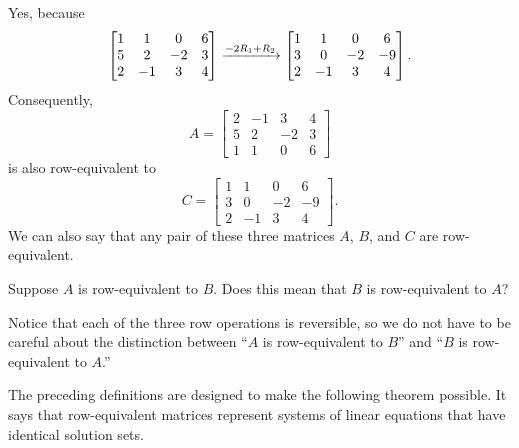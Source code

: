 \documentclass{ximera}
\begin{document}
\begin{example}
\begin{question}
    \begin{feedback}
      Yes, because
      \[
        \begin{bmatrix}
          1&1&0&6\\
          5&2&-2&3\\
          2&-1&3&4
        \end{bmatrix}
        \xrightarrow{-2R_{1}+R_{2}}
        \begin{bmatrix}
          1&1&0&6\\
          3&0&-2&-9\\
          2&-1&3&4
        \end{bmatrix}.
      \]
      Consequently, 
      \[
        A=\begin{bmatrix}
          2&-1&3&4\\
          5&2&-2&3\\
          1&1&0&6
        \end{bmatrix}
      \]
      is also row-equivalent to
      \[
        C = \begin{bmatrix}
          1&1&0&6\\
          3&0&-2&-9\\
          2&-1&3&4
        \end{bmatrix}.
      \]
      We can also say that any pair of these three matrices $A$, $B$, and $C$ are row-equivalent.
    \end{feedback}
  \end{question}
\end{example}

\begin{exercise}
  Suppose $A$ is row-equivalent to $B$.  Does this mean that $B$ is row-equivalent to $A$?

  \begin{multipleChoice}
  \end{multipleChoice}  

  \begin{feedback}
    Notice that each of the three row operations is reversible, so we
    do not have to be careful about the distinction between ``$A$ is
    row-equivalent to $B$'' and ``$B$ is row-equivalent to $A$.''
  \end{feedback}
\end{exercise}

The preceding definitions are designed to make the following theorem possible.  It says that row-equivalent matrices represent systems of linear equations that have identical solution sets.
\end{document}

